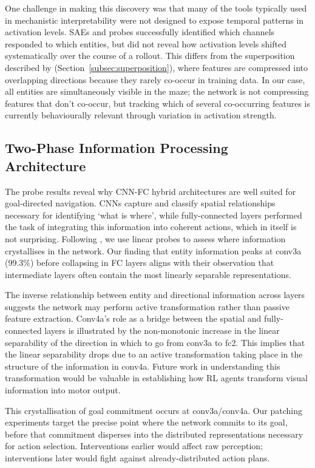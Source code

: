 One challenge in making this discovery was that many of the tools typically used in mechanistic interpretability were not designed to expose temporal patterns in activation levels. SAEs and probes successfully identified which channels responded to which entities, but did not reveal how activation levels shifted systematically over the course of a rollout. This differs from the superposition described by \citet{elhage2022superposition} (Section~\ref{subsec:superposition}), where features are compressed into overlapping directions because they rarely co-occur in training data. In our case, all entities are simultaneously visible in the maze; the network is not compressing features that don't co-occur, but tracking which of several co-occurring features is currently behaviourally relevant through variation in activation strength.



\subsection{Two-Phase Information Processing Architecture}
The probe results reveal why CNN-FC hybrid architectures are well suited for goal-directed navigation. CNNs capture and classify spatial relationships necessary for identifying `what is where', while fully-connected layers performed the task of integrating this information into coherent actions, which in itself is not surprising. Following \citet{alain_2018_understanding}, we use linear probes to assess where information crystallises in the network. Our finding that entity information peaks at conv3a (99.3\%) before collapsing in FC layers aligns with their observation that intermediate layers often contain the most linearly separable representations.

The inverse relationship between entity and directional information across layers suggests the network may perform active transformation rather than passive feature extraction. Conv4a's role as a bridge between the spatial and fully-connected layers is illustrated by the non-monotonic increase in the linear separability of the direction in which to go from conv3a to fc2. This implies that the linear separability drops due to an active transformation taking place in the structure of the information in conv4a. Future work in understanding this transformation would be valuable in establishing how RL agents transform visual information into motor output.

This crystallisation of goal commitment occurs at conv3a/conv4a. Our patching experiments target the precise point where the network commits to its goal, before that commitment disperses into the distributed representations necessary for action selection. Interventions earlier would affect raw perception; interventions later would fight against already-distributed action plans.

